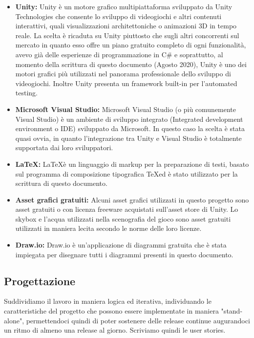 \documentclass[12pt]{article}
\begin{document}
\begin{itemize}
\item{\textbf{Unity:}} Unity è un motore grafico multipiattaforma sviluppato da Unity Technologies che consente lo sviluppo di videogiochi e altri contenuti interattivi, quali visualizzazioni architettoniche o animazioni 3D in tempo reale. La scelta è ricaduta su Unity piuttosto che sugli altri concorrenti sul mercato in quanto esso offre un piano gratuito completo di ogni funzionalità, avevo già delle esperienze di programmazione in C\# e soprattutto, al momento della scrittura di questo documento (Agosto 2020), Unity è uno dei motori grafici più utilizzati nel panorama professionale dello sviluppo di videogiochi. Inoltre Unity presenta un framework built-in per l'automated testing.
\item{\textbf{Microsoft Visual Studio:}} Microsoft Visual Studio (o più comunemente Visual Studio) è un ambiente di sviluppo integrato (Integrated development environment o IDE) sviluppato da Microsoft. In questo caso la scelta è stata quasi ovvia, in quanto l'integrazione tra Unity e Visual Studio è totalmente supportata dai loro sviluppatori.
\item{\textbf{\LaTeX:}} \LaTeX è un linguaggio di markup per la preparazione di testi, basato sul programma di composizione tipografica \TeX ed è stato utilizzato per la scrittura di questo documento.
\item{\textbf{Asset grafici gratuiti:}} Alcuni asset grafici utilizzati in questo progetto sono asset gratuiti o con licenza freeware acquistati sull'asset store di Unity. Lo skybox e l'acqua utilizzati nella scenografia del gioco sono asset gratuiti utilizzati in maniera lecita secondo le norme delle loro licenze.
\item{\textbf{Draw.io:}} Draw.io è un'applicazione di diagrammi gratuita che è stata impiegata per disegnare tutti i diagrammi presenti in questo documento.
\end{itemize}

\subsection{Progettazione}
Suddividiamo il lavoro in maniera logica ed iterativa, individuando le caratteristiche del progetto che possono essere implementate in maniera "stand-alone", permettendoci quindi di poter sostenere delle release continue augurandoci un ritmo di almeno una release al giorno. Scriviamo quindi le user stories.
\newline
\end{document}
